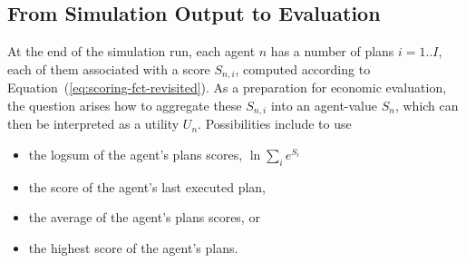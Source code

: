 \subsection{From Simulation Output to Evaluation}
\label{ch:economicEval:valuingBehavior:output2Eval}


At the end of the simulation run, each agent $n$ has a number of plans $i=1..I$, each of them associated with a score $S_{n,i}$, computed according to Equation~(\ref{eq:scoring-fct-revisited}).
%
%
As a preparation for economic evaluation, the question arises how to aggregate these $S_{n,i}$ into an agent-value $S_n$, which can then be interpreted as a utility $U_n$.  Possibilities include to use
%
%
\begin{itemize}\styleItemize
\item the logsum of the agent's plans scores, \ie $\ln \sum_i e^{S_i}$
\item the score of the agent's last executed plan, 
\item the average of the agent's plans scores, or
\item the highest score of the agent's plans.
\end{itemize}
%

